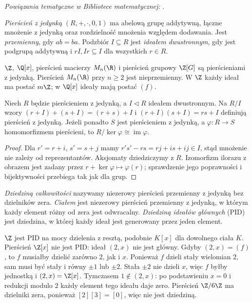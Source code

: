 \noindent\emph{Powiązania tematyczne w Bibliotece matematycznej:} .

\begin{definicja}
\emph{Pierścień z jedynką} $(R,+,\cdot,0,1)$ ma abelową grupę
addytywną, łączne mnożenie z jedynką oraz rozdzielność mnożenia
względem dodawania. Jest \emph{przemienny}, gdy $ab=ba$.
Podzbiór $I\subseteq R$ jest \emph{ideałem dwustronnym}, gdy
jest podgrupą addytywną i $rI,Ir\subseteq I$ dla wszystkich $r\in R$.
\end{definicja}
\begin{przyklad}
$\Z$, $\Q[x]$, pierścień macierzy $M_n(\R)$ i pierścień grupowy
$\Z[G]$ są pierścieniami z jedynką. Pierścień $M_n(\R)$
przy $n\ge2$ jest nieprzemienny. W $\Z$ każdy ideał ma postać
$m\Z$; w $\Q[x]$ ideały mają postać $(f)$.
\end{przyklad}
\begin{twierdzenie}
Niech $R$ będzie pierścieniem z jedynką, a
$I\triangleleft R$ ideałem dwustronnym.
Na $R/I$ wzory $(r+I)+(s+I)=(r+s)+I$
i $(r+I)(s+I)=rs+I$ definiują pierścień z jedynką.
Jeżeli ponadto $S$ jest pierścieniem z jedynką,
a $\varphi:R\to S$ homomorfizmem pierścieni, to
$R/\ker\varphi\cong\operatorname{im}\varphi$.
\end{twierdzenie}
\begin{proof}
Dla $r'=r+i$, $s'=s+j$ mamy
$r's'-rs=rj+is+ij\in I$, stąd mnożenie nie zależy
od reprezentantów. Aksjomaty dziedziczymy z $R$.
Izomorfizm ilorazu z obrazem jest zadany przez $r+\ker\varphi
\mapsto\varphi(r)$; sprawdzenie jego poprawności i bijektywności
przebiega tak jak dla grup.
\end{proof}
\begin{definicja}
\emph{Dziedziną całkowitości} nazywamy niezerowy pierścień
przemienny z jedynką bez dzielników zera. \emph{Ciałem} jest
niezerowy pierścień przemienny z jedynką, w którym każdy
element różny od zera jest odwracalny. \emph{Dziedziną ideałów głównych} (PID) jest
dziedzina, w której każdy ideał jest generowany przez jeden element.
\end{definicja}
\begin{przyklad}
$\Z$ jest PID na mocy dzielenia z resztą, podobnie $K[x]$
dla dowolnego ciała $K$. Pierścień $\Z[x]$ nie jest PID:
ideał $(2,x)$ nie jest główny. Gdyby $(2,x)=(f)$,
to $f$ musiałby dzielić zarówno $2$, jak i $x$. Ponieważ
$f$ dzieli stały wielomian $2$, sam musi być stały i równy
$\pm1$ lub $\pm2$. Stała $\pm2$ nie dzieli $x$, więc
$f$ byłby jednostką i $(2,x)=\Z[x]$. Tymczasem
$1\notin(2,x)$: po podstawieniu $x=0$ i redukcji modulo $2$
każdy element tego ideału daje zero. Pierścień $\Z/6\Z$ ma dzielniki zera,
ponieważ $[2][3]=[0]$, więc nie jest dziedziną.
\end{przyklad}

